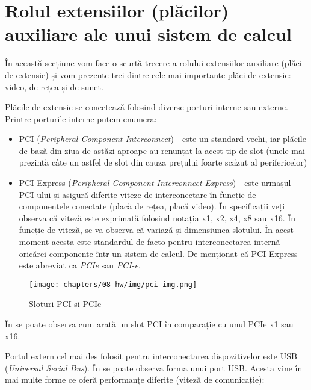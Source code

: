 \section{Rolul extensiilor (plăcilor) auxiliare ale unui sistem de calcul}
\label{sec:hw:extension}

În această secțiune vom face o scurtă trecere a rolului extensiilor auxiliare
(plăci de extensie) și vom prezente trei dintre cele mai importante plăci de
extensie: video, de rețea și de sunet.

Plăcile de extensie se conectează folosind diverse porturi interne sau externe.
Printre porturile interne putem enumera:

\begin{itemize}
  \item PCI 
          (\textit{Peripheral Component Interconnect}) - este un standard
          vechi, iar plăcile de bază din ziua de astăzi aproape au
          renunțat la acest tip de slot (unele mai prezintă câte un astfel
          de slot din cauza prețului foarte scăzut al perifericelor)
  \item PCI Express (\textit{Peripheral Component Interconnect Express}) -
          este urmașul PCI-ului și asigură diferite viteze de
          interconectare în funcție de componentele conectate (placă de
          rețea, placă video). În specificații veți observa că viteză
          este exprimată folosind notația x1, x2, x4, x8 sau x16. În
          funcție de viteză, se va observa că variază și dimensiunea
          slotului. În acest moment acesta este standardul de-facto pentru
          interconectarea internă oricărei componente într-un sistem de
          calcul. De menționat că PCI Express este abreviat ca
          \textit{PCIe} sau \textit{PCI-e}.
\end{itemize}

\begin{figure}[!htbp]
  \centering
  \texttt{[image: chapters/08-hw/img/pci-img.png]}
  \caption{Sloturi PCI și PCIe\protect\footnotemark}
  \label{fig:hw:pci}
\end{figure}

În  se poate observa cum arată un slot PCI în
comparație cu unul PCIe x1 sau x16.

Portul extern cel mai des folosit pentru interconectarea dispozitivelor este
USB (\textit{Universal Serial Bus}). În  se poate observa forma unui port USB. Acesta vine în mai
multe forme ce oferă performanțe diferite (viteză de comunicație):

